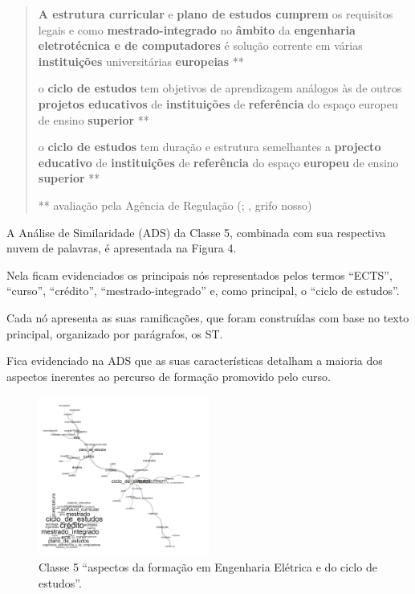 \documentclass{textolivre-html}
\begin{document}
\begin{quote}
\textbf{A estrutura curricular} e \textbf{plano de estudos cumprem} os requisitos legais e como \textbf{mestrado-integrado} no \textbf{âmbito} da \textbf{engenharia eletrotécnica e de computadores} é solução corrente em várias \textbf{instituições} universitárias \textbf{europeias} **

o \textbf{ciclo de estudos} tem objetivos de aprendizagem análogos às de outros \textbf{projetos educativos} de \textbf{instituições} de \textbf{referência} do espaço europeu de ensino \textbf{superior} **   

o \textbf{ciclo de estudos} tem duração e estrutura semelhantes a \textbf{projecto educativo} de \textbf{instituições} de \textbf{referência} do espaço \textbf{europeu} de ensino \textbf{superior} **      

** avaliação pela Agência de Regulação (\cite{A3ES2015a}; \cite{A3ES2015b}, grifo nosso)
\end{quote}

A Análise de Similaridade (ADS) da Classe 5, combinada com sua respectiva nuvem de palavras, é apresentada na Figura 4. 

Nela ficam evidenciados os principais nós representados pelos termos “ECTS”, “curso”, “crédito”, “mestrado-integrado” e, como principal, o “ciclo de estudos”.

Cada nó apresenta as suas ramificações, que foram construídas com base no texto principal, organizado por parágrafos, os ST. 

Fica evidenciado na ADS que as suas características detalham a maioria dos aspectos inerentes ao percurso de formação promovido pelo curso.

\begin{figure}[htbp]
 \centering
 \includegraphics[width=0.5\textwidth]{Fig04.png}
 \caption{Classe 5 “aspectos da formação em Engenharia Elétrica e do ciclo de estudos”.}
 \label{Fig04}
\end{figure}
\end{document}
